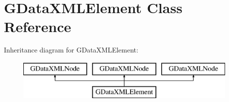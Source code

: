 \hypertarget{interface_g_data_x_m_l_element}{
\section{GDataXMLElement Class Reference}
\label{interface_g_data_x_m_l_element}
}
Inheritance diagram for GDataXMLElement:\begin{figure}[H]
\begin{center}
\leavevmode
\includegraphics[height=2.000000cm]{interface_g_data_x_m_l_element}
\end{center}
\end{figure}
